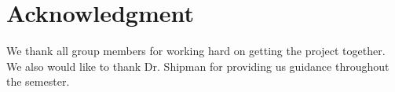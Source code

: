 \section*{Acknowledgment}
We thank all group members for working hard on getting the project together. We also would like to thank Dr. Shipman for providing us guidance throughout the semester.